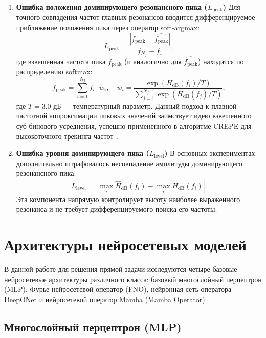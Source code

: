 \begin{enumerate}
    \item \textbf{Ошибка положения доминирующего резонансного пика ($L_{\text{peak}}$)}
    Для точного совпадения частот главных резонансов вводится дифференцируемое приближение положения пика через оператор soft-argmax:
    \begin{equation}
        L_{\text{peak}} = \frac{|f_{\text{peak}} - \widehat{f_{\text{peak}}}|}{f_{N_f} - f_1},
    \end{equation}
    где взвешенная частота пика $f_{\text{peak}}$ (и аналогично для $\widehat{f_{\text{peak}}}$) находится по распределению softmax:
    \begin{equation}
        f_{\text{peak}} = \sum_{i=1}^{N_f} f_i \cdot w_i, \quad w_i = \frac{\exp\left(H_{\text{dB}}(f_i)/T\right)}{\sum_{j=1}^{N_f} \exp\left(H_{\text{dB}}(f_j)/T\right)},
    \end{equation}
    где $T = 3.0$ дБ — температурный параметр. Данный подход к плавной частотной аппроксимации пиковых значений заимствует идею взвешенного суб-бинового усреднения, успешно примененного в алгоритме CREPE для высокоточного трекинга частот~\cite{kim2018crepe}.

    \item \textbf{Ошибка уровня доминирующего пика ($L_{\text{level}}$)}
    В основных экспериментах дополнительно штрафовалось несовпадение амплитуды доминирующего резонансного пика:
    \begin{equation}
        L_{\text{level}} = \left| \max_i \widehat{H}_{\text{dB}}(f_i) - \max_i H_{\text{dB}}(f_i) \right|.
    \end{equation}
    Эта компонента напрямую контролирует высоту наиболее выраженного резонанса и не требует дифференцируемого поиска его частоты.
\end{enumerate}

\section{Архитектуры нейросетевых моделей}
\label{sec:architectures}

В данной работе для решения прямой задачи исследуются четыре базовые нейросетевые архитектуры различного класса: базовый многослойный перцептрон (MLP), Фурье-нейросетевой оператор (FNO), нейронная сеть оператора DeepONet и нейросетевой оператор Mamba (Mamba Operator).

\subsection{Многослойный перцептрон (MLP)}
\label{subsec:mlp}


